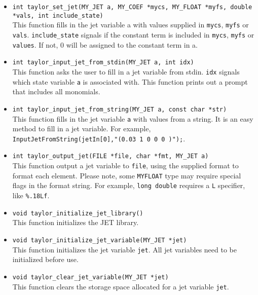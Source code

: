 \documentclass[10pt]{article}
\theoremstyle{remark}
\newcommand{\myfloat}{{\tt MY\symbol{95}FLOAT}}
\begin{document}
\begin{itemize}
\item
  {\verb+int taylor_set_jet(MY_JET a, MY_COEF *mycs, MY_FLOAT *myfs, double *vals, int include_state)+\\ This
    function fills in the jet variable a with values supplied in
    \verb+mycs+, \verb+myfs+ or \verb+vals+. \verb+include_state+
    signals if the constant term is included in \verb+mycs+,
    \verb+myfs+ or \verb+values+. If not, 0 will be assigned to the
    constant term in a. }
    
\item{\verb+int taylor_input_jet_from_stdin(MY_JET a, int idx)+\\
    This function asks the user to fill in a jet variable from stdin.
    \verb+idx+ signals which state variable \verb+a+ is associated
    with.  This function prints out a prompt that includes all
    monomials.}
    
\item{\verb+int taylor_input_jet_from_string(MY_JET a, const char *str)+\\
    This function fills in the jet variable \verb+a+ with values from
    a string. It is an easy method to fill in a jet variable. For
    example, \verb+InputJetFromString(jetIn[0],"(0.03 1 0 0 0 )");+.}
    
\item \verb+int taylor_output_jet(FILE *file, char *fmt, MY_JET a)+\\
    This function output a jet variable to \verb+file+, using the
    supplied format to format each element. Please note, some
    \myfloat{} type may require special flags in the format
    string. For example, \verb+long double+ requires a \verb+L+
    specifier, like \verb+%.18Lf+.

\item{\verb+void taylor_initialize_jet_library()+\\    
    This function initializes the JET library. }
    
\item{\verb+void taylor_initialize_jet_variable(MY_JET *jet)+\\
    This function initializes the jet variable \verb+jet+. All jet
    variables need to be initialized before use.}
    
\item{\verb+void taylor_clear_jet_variable(MY_JET *jet)+\\
  This function clears the storage space allocated for a jet variable
  \verb+jet+.}
  

\end{itemize}
\end{document}
